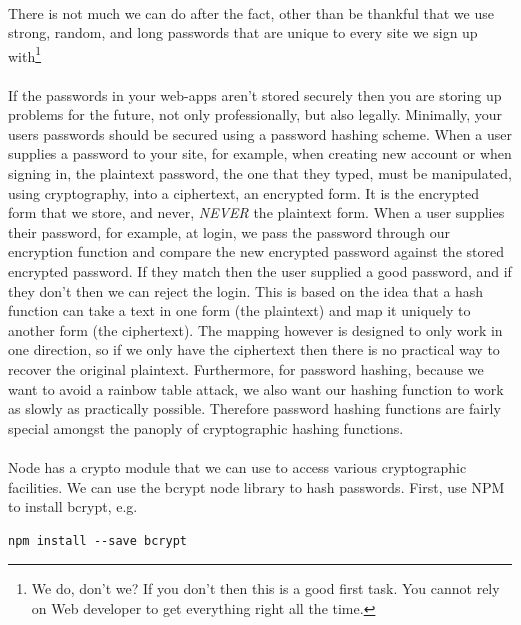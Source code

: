 \documentclass[10pt, a4paper, twosize]{article}
\begin{document}
\paragraph{} There is not much we can do after the fact, other than be thankful that we use strong, random, and long passwords that are unique to every site we sign up with\footnote{We do, don't we? If you don't then this is a good first task. You cannot rely on Web developer to get everything right all the time.}


\paragraph{} If the passwords in your web-apps aren't stored securely then you are storing up problems for the future, not only professionally, but also legally. Minimally, your users passwords should be secured using a password hashing scheme. When a user supplies a password to your site, for example, when creating new account or when signing in, the plaintext password, the one that they typed, must be manipulated, using cryptography, into a ciphertext, an encrypted form. It is the encrypted form that we store, and never, \emph{NEVER} the plaintext form. When a user supplies their password, for example, at login, we pass the password through our encryption function and compare the new encrypted password against the stored encrypted password. If they match then the user supplied a good password, and if they don't then we can reject the login. This is based on the idea that a hash function can take a text in one form (the plaintext) and map it uniquely to another form (the ciphertext). The mapping however is designed to only work in one direction, so if we only have the ciphertext then there is no practical way to recover the original plaintext. Furthermore, for password hashing, because we want to avoid a rainbow table attack, we also want our hashing function to work as slowly as practically possible. Therefore password hashing functions are fairly special amongst the panoply of cryptographic hashing functions.

\paragraph{} Node has a crypto module that we can use to access various cryptographic facilities. We can use the bcrypt node library to hash passwords. First, use NPM to install bcrypt, e.g.

\begin{lstlisting}[style=DOS]
    npm install --save bcrypt
\end{lstlisting}
\end{document}

